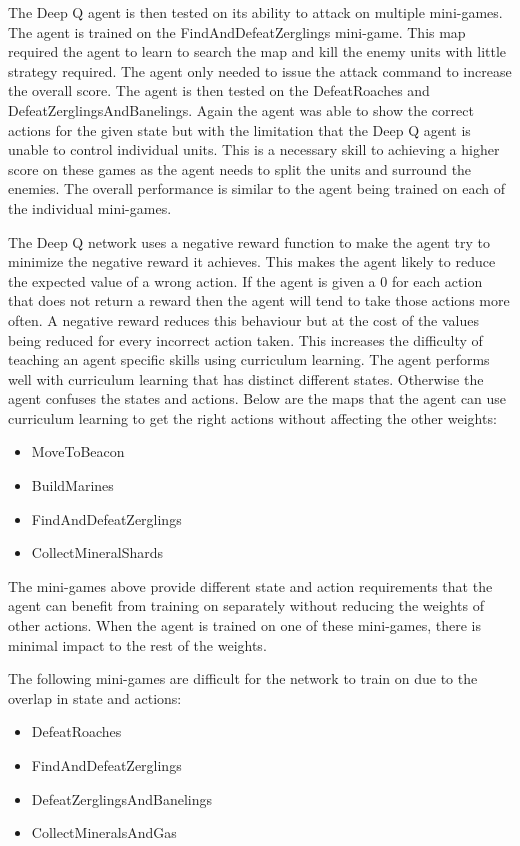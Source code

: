 The Deep Q agent is then tested on its ability to attack on multiple mini-games.
The agent is trained on the FindAndDefeatZerglings mini-game. This map required
the agent to learn to search the map and kill the enemy units with little
strategy required. The agent only needed to issue the attack command to increase
the overall score. The agent is then tested on the DefeatRoaches and
DefeatZerglingsAndBanelings. Again the agent was able to show the correct
actions for the given state but with the limitation that the Deep Q agent is
unable to control individual units. This is a necessary skill to achieving a
higher score on these games as the agent needs to split the units and surround
the enemies. The overall performance is similar to the agent being trained on
each of the individual mini-games.

The Deep Q network uses a negative reward function to make the agent try to
minimize the negative reward it achieves. This makes the agent likely to reduce
the expected value of a wrong action. If the agent is given a 0 for each action
that does not return a reward then the agent will tend to take those actions
more often. A negative reward reduces this behaviour but at the cost of the
values being reduced for every incorrect action taken. This increases the
difficulty of teaching an agent specific skills using curriculum learning. The
agent performs well with curriculum learning that has distinct different states.
Otherwise the agent confuses the states and actions. Below are the maps that the
agent can use curriculum learning to get the right actions without affecting the
other weights:

\begin{itemize}
    \item MoveToBeacon
    \item BuildMarines
    \item FindAndDefeatZerglings
    \item CollectMineralShards
\end{itemize}

The mini-games above provide different state and action requirements that the
agent can benefit from training on separately without reducing the weights of
other actions. When the agent is trained on one of these mini-games, there is
minimal impact to the rest of the weights.

The following mini-games are difficult for the network to train on due to the
overlap in state and actions:

\begin{itemize}
    \item DefeatRoaches
    \item FindAndDefeatZerglings
    \item DefeatZerglingsAndBanelings
    \item CollectMineralsAndGas
\end{itemize}

